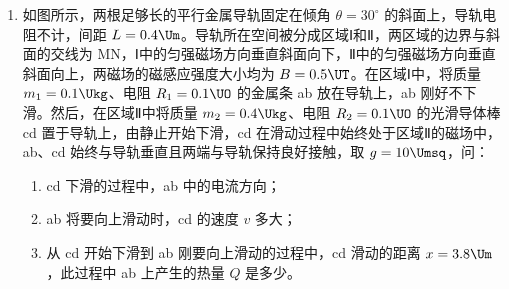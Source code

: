 \documentclass[\gkver]{gaokaozhenti}
\begin{document}
\begin{enumerate}
\item
如图所示，两根足够长的平行金属导轨固定在倾角 $\theta=30^{\circ}$ 的斜面上，导轨电阻不计，间距 $L=0.4\Um$。导轨所在空间被分成区域Ⅰ和Ⅱ，两区域的边界与斜面的交线为 MN，Ⅰ中的匀强磁场方向垂直斜面向下，Ⅱ中的匀强磁场方向垂直斜面向上，两磁场的磁感应强度大小均为 $B=0.5\UT$。在区域Ⅰ中，将质量 $m_{1}=0.1\Ukg$、电阻 $R_{1}=0.1\UO$ 的金属条 ab 放在导轨上，ab 刚好不下滑。然后，在区域Ⅱ中将质量 $m_{2}=0.4\Ukg$、电阻 $R_{2}=0.1\UO$ 的光滑导体棒 cd 置于导轨上，由静止开始下滑，cd 在滑动过程中始终处于区域Ⅱ的磁场中，ab、cd 始终与导轨垂直且两端与导轨保持良好接触，取 $g=10\Umsq$，问：
\begin{enumerate}
	\item
	cd 下滑的过程中，ab 中的电流方向；
	\item
	ab 将要向上滑动时，cd 的速度 $v$ 多大；
	\item
	从 cd 开始下滑到 ab 刚要向上滑动的过程中，cd 滑动的距离 $x=3.8\Um$，此过程中 ab 上产生的热量 $Q$ 是多少。
\end{enumerate}
\end{enumerate}
\end{document}
